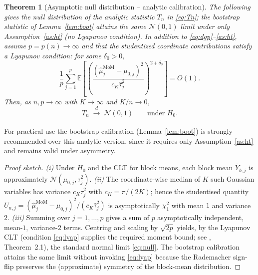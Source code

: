 \documentclass[pdflatex,sn-mathphys-num]{sn-jnl}
\newcommand{\E}{\mathbb{E}}
\theoremstyle{thmstyleone}%
\newtheorem{theorem}{Theorem}%
\theoremstyle{thmstyletwo}%
\theoremstyle{thmstylethree}%
\begin{document}
\begin{theorem}[Asymptotic null distribution -- analytic calibration]
\label{thm:null}
The following gives the null distribution of the analytic statistic $T_n$ in
\eqref{eq:Tn}; the bootstrap statistic of Lemma~\ref{lem:boot} attains the same
$\mathcal{N}(0,1)$ limit under only Assumption~\ref{as:ht} (no Lyapunov
condition). In addition to \eqref{eq:dgp}--\eqref{as:ht}, assume
$p=p(n)\to\infty$ and that the studentized coordinate contributions satisfy a
Lyapunov condition: for some $\delta_0>0$,
\begin{equation}
\label{eq:lyap}
\frac{1}{p}\sum_{j=1}^p
\E\!\left[\left(
  \frac{(\hat\mu^{\mathrm{MoM}}_j-\mu_{0,j})^2}{c_K\hat\tau_j^2}
  \right)^{2+\delta_0}\right]
 = O(1).
\end{equation}
Then, as $n,p\to\infty$ with $K\to\infty$ and $K/n\to 0$,
\begin{equation}
\label{eq:null}
T_n \;\xrightarrow[]{d}\; \mathcal{N}(0,1)
\qquad\text{under }H_0.
\end{equation}
\end{theorem}
For practical use the bootstrap calibration (Lemma~\ref{lem:boot}) is strongly
recommended over this analytic version, since it requires only
Assumption~\ref{as:ht} and remains valid under asymmetry.
\begin{proof}[Proof sketch]
\emph{(i)} Under $H_0$ and the CLT for block means, each block mean
$\bar Y_{k,j}$ is approximately $\mathcal{N}(\mu_{0,j},\tau_j^2)$.
\emph{(ii)} The coordinate-wise median of $K$ such Gaussian variables has
variance $c_K\tau_j^2$ with $c_K=\pi/(2K)$; hence the studentised quantity
$U_{n,j}=(\hat\mu^{\mathrm{MoM}}_j-\mu_{0,j})^2/(c_K\hat\tau_j^2)$ is asymptotically
$\chi^2_1$ with mean $1$ and variance $2$. \emph{(iii)} Summing over
$j=1,\dots,p$ gives a sum of $p$ asymptotically independent, mean-$1$,
variance-$2$ terms. Centring and scaling by $\sqrt{2p}$ yields, by the
Lyapunov CLT (condition \eqref{eq:lyap} supplies the required moment bound; see
\citeauthor{fang2019} \citep{fang2019}, Theorem~2.1), the standard normal
limit \eqref{eq:null}. The bootstrap calibration attains the same limit without
invoking \eqref{eq:lyap} because the Rademacher sign-flip preserves the
(approximate) symmetry of the block-mean distribution.
\end{proof}
\end{document}
